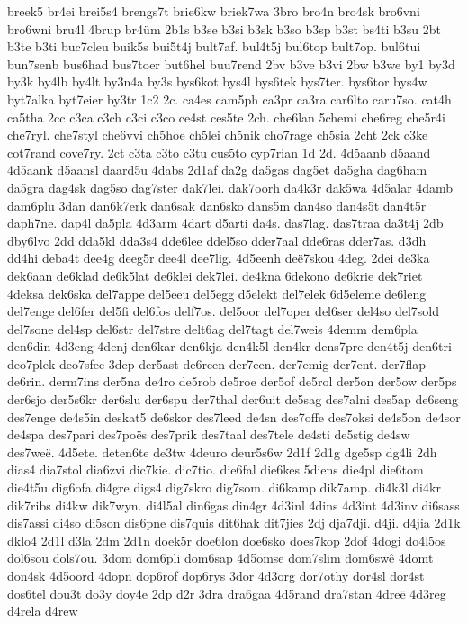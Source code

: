 {breek5
br4ei
brei5s4
brengs7t
brie6kw
briek7wa
3bro
bro4n
bro4sk
bro6vni
bro6wni
bru4l
4brup
br4üm
2b1s
b3se
b3si
b3sk
b3so
b3sp
b3st
bs4ti
b3su
2bt
b3te
b3ti
buc7cleu
buik5s
bui5t4j
bult7af.
bul4t5j
bul6top
bult7op.
bul6tui
bun7senb
bus6had
bus7toer
but6hel
buu7rend
2bv
b3ve
b3vi
2bw
b3we
by1
by3d
by3k
by4lb
by4lt
by3n4a
by3s
bys6kot
bys4l
bys6tek
bys7ter.
bys6tor
bys4w
byt7alka
byt7eier
by3tr
1c2
2c.
ca4es
cam5ph
ca3pr
ca3ra
car6lto
caru7so.
cat4h
ca5tha
2cc
c3ca
c3ch
c3ci
c3co
ce4st
ces5te
2ch.
che6lan
5chemi
che6reg
che5r4i
che7ryl.
che7styl
che6vvi
ch5hoe
ch5lei
ch5nik
cho7rage
ch5sia
2cht
2ck
c3ke
cot7rand
cove7ry.
2ct
c3ta
c3to
c3tu
cus5to
cyp7rian
1d
2d.
4d5aanb
d5aand
4d5aank
d5aansl
daard5u
4dabs
2d1af
da2g
da5gas
dag5et
da5gha
dag6ham
da5gra
dag4sk
dag5so
dag7ster
dak7lei.
dak7oorh
da4k3r
dak5wa
4d5alar
4damb
dam6plu
3dan
dan6k7erk
dan6sak
dan6sko
dans5m
dan4so
dan4s5t
dan4t5r
daph7ne.
dap4l
da5pla
4d3arm
4dart
d5arti
da4s.
das7lag.
das7traa
da3t4j
2db
dby6lvo
2dd
dda5kl
dda3s4
dde6lee
ddel5so
dder7aal
dde6ras
dder7as.
d3dh
dd4hi
deba4t
dee4g
deeg5r
dee4l
dee7lig.
4d5eenh
deë7skou
4deg.
2dei
de3ka
dek6aan
de6klad
de6k5lat
de6klei
dek7lei.
de4kna
6dekono
de6krie
dek7riet
4deksa
dek6ska
del7appe
del5eeu
del5egg
d5elekt
del7elek
6d5eleme
de6leng
del7enge
del6fer
del5fi
del6fos
delf7os.
del5oor
del7oper
del6ser
del4so
del7sold
del7sone
del4sp
del6str
del7stre
delt6ag
del7tagt
del7weis
4demm
dem6pla
den6din
4d3eng
4denj
den6kar
den6kja
den4k5l
den4kr
dens7pre
den4t5j
den6tri
deo7plek
deo7sfee
3dep
der5ast
de6reen
der7een.
der7emig
der7ent.
der7flap
de6rin.
derm7ins
der5na
de4ro
de5rob
de5roe
der5of
de5rol
der5on
der5ow
der5ps
der6sjo
der5s6kr
der6slu
der6spu
der7thal
der6uit
de5sag
des7alni
des5ap
de6seng
des7enge
de4s5in
deskat5
de6skor
des7leed
de4sn
des7offe
des7oksi
de4s5on
de4sor
de4spa
des7pari
des7poës
des7prik
des7taal
des7tele
de4sti
de5stig
de4sw
des7weë.
4d5ete.
deten6te
de3tw
4deuro
deur5s6w
2d1f
2d1g
dge5sp
dg4li
2dh
dias4
dia7stol
dia6zvi
dic7kie.
dic7tio.
die6fal
die6kes
5diens
die4pl
die6tom
die4t5u
dig6ofa
di4gre
digs4
dig7skro
dig7som.
di6kamp
dik7amp.
di4k3l
di4kr
dik7ribs
di4kw
dik7wyn.
di4l5al
din6gas
din4gr
4d3inl
4dins
4d3int
4d3inv
di6sass
dis7assi
di4so
di5son
dis6pne
dis7quis
dit6hak
dit7jies
2dj
dja7dji.
d4ji.
d4jia
2d1k
dklo4
2d1l
d3la
2dm
2d1n
doek5r
doe6lon
doe6sko
does7kop
2dof
4dogi
do4l5os
dol6sou
dols7ou.
3dom
dom6pli
dom6sap
4d5omse
dom7slim
dom6swê
4domt
don4sk
4d5oord
4dopn
dop6rof
dop6rys
3dor
4d3org
dor7othy
dor4sl
dor4st
dos6tel
dou3t
do3y
doy4e
2dp
d2r
3dra
dra6gaa
4d5rand
dra7stan
4dreë
4d3reg
d4rela
d4rew
}
